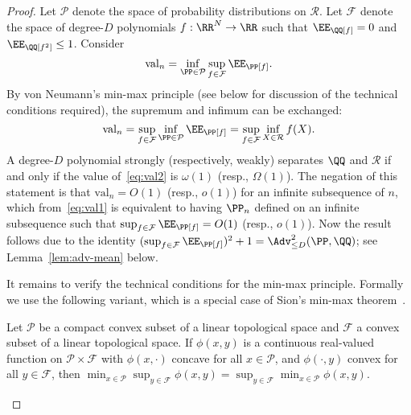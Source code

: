 \documentclass{article}
\begin{document}
\begin{proof}
Let $\mathcal{P}$ denote the space of probability distributions on $\mathcal{R}$. Let $\mathcal{F}$ denote the space of degree-$D$ polynomials $f: \RR^N \to \RR$ such that $\EE_\QQ[f] = 0$ and $\EE_\QQ[f^2] \le 1$. Consider
\begin{equation}\label{eq:val1}
\mathrm{val}_n = \inf_{\PP \in \mathcal{P}} \sup_{f \in \mathcal{F}} \EE_\PP[f].
\end{equation}
By von Neumann's min-max principle (see below for discussion of the technical conditions required), the supremum and infimum can be exchanged:
\begin{equation}\label{eq:val2}
\mathrm{val}_n = \sup_{f \in \mathcal{F}} \inf_{\PP \in \mathcal{P}} \EE_\PP[f] = \sup_{f \in \mathcal{F}} \inf_{X \in \mathcal{R}} f(X).
\end{equation}
A degree-$D$ polynomial strongly (respectively, weakly) separates $\QQ$ and $\mathcal{R}$ if and only if the value of~\eqref{eq:val2} is $\omega(1)$ (resp., $\Omega(1)$). The negation of this statement is that $\mathrm{val}_n = O(1)$ (resp., $o(1)$) for an infinite subsequence of $n$, which from~\eqref{eq:val1} is equivalent to having $\PP_n$ defined on an infinite subsequence such that $\sup_{f \in \mathcal{F}} \EE_\PP[f] = O(1)$ (resp., $o(1)$). Now the result follows due to the identity $(\sup_{f \in \mathcal{F}} \EE_\PP[f])^2 + 1 = \Adv_{\le D}^2(\PP,\QQ)$; see Lemma~\ref{lem:adv-mean} below.

It remains to verify the technical conditions for the min-max principle. Formally we use the following variant, which is a special case of Sion's min-max theorem~\cite{sion-1,sion-2}.

\begin{theorem}
Let $\mathcal{P}$ be a compact convex subset of a linear topological space and $\mathcal{F}$ a convex subset of a linear topological space. If $\phi(x,y)$ is a continuous real-valued function on $\mathcal{P} \times \mathcal{F}$ with $\phi(x,\cdot)$ concave for all $x \in \mathcal{P}$, and $\phi(\cdot,y)$ convex for all $y \in \mathcal{F}$, then $\min_{x \in \mathcal{P}} \sup_{y \in \mathcal{F}} \phi(x,y) = \sup_{y \in \mathcal{F}} \min_{x \in \mathcal{P}} \phi(x,y)$.
\end{theorem}


\end{proof}
\end{document}
